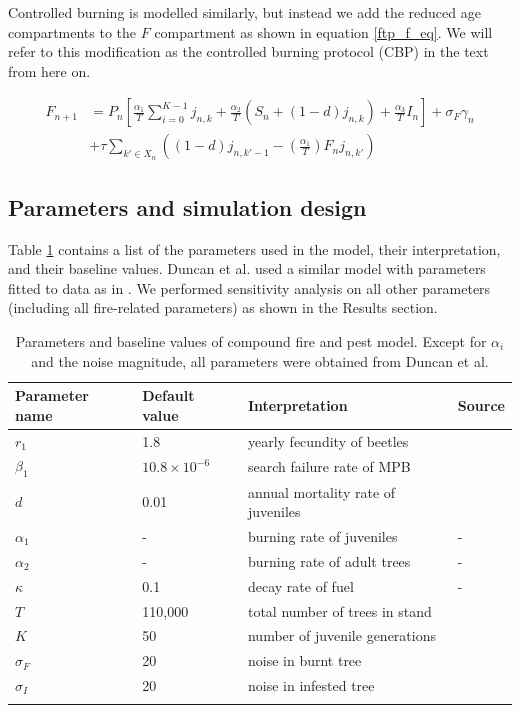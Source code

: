 Controlled burning is modelled similarly, but instead we add the reduced age compartments to the $F$ compartment as shown in equation \ref{ftp_f_eq}. We will refer to this modification as the controlled burning protocol (CBP) in the text from here on.

\begin{align}
  F_{n+1} &=  P_n \left[\frac{\alpha_1}{T} \sum_{i = 0}^{K-1} j_{n,k} + \frac{\alpha_2}{T}( S_n + (1 - d)j_{n,k}) + \frac{\alpha_3}{T}I_n\right] + \sigma_F\gamma_n
  \\ &+ \tau\sum_{k' \in X_n}\left((1-d) j_{n, k' - 1} - (\frac{\alpha_1}{T}) F_n j_{n,k'}\right)\label{ftp_f_eq}
\end{align}

\subsection{Parameters and simulation design}

Table \ref{params} contains a list of the parameters used in the model, their interpretation, and their baseline values. Duncan et al. used a similar model with parameters fitted to data as in \cite{agne2016fire}. We performed sensitivity analysis on all other parameters (including all fire-related parameters) as shown in the Results section.

\begin{table}
\caption{Parameters and baseline values of compound fire and pest model. Except for $\alpha_i$ and the noise magnitude, all parameters were obtained from Duncan et al. \cite{duncan2015model}}
\begin{tabular}{llll}
\hline\noalign{\smallskip}
  Parameter name & Default value & Interpretation & Source \\
\hline\noalign{\smallskip}
  $r_1$ & 1.8  & yearly fecundity of beetles & \cite{powell2009connecting}  \\
  $\beta_1$ & $10.8 \times 10^{-6}$  & search failure rate of MPB & \cite{powell2009connecting}   \\
  $d$ & 0.01  & annual mortality rate of juveniles & \cite{duncan2015model}  \\
  $\alpha_1$& - & burning rate of juveniles & - \\
  $\alpha_2$& - & burning rate of adult trees & - \\
  $\kappa$& 0.1 & decay rate of fuel & - \\
  $T$ & 110,000 & total number of trees in stand & \cite{powell2009connecting} \\
  $K$ & 50 & number of juvenile generations & \cite{duncan2015model} \\
  $\sigma_F$ & 20 & noise in burnt tree\\
  $\sigma_I$ & 20 & noise in infested tree\\
\hline\noalign{\smallskip}
\end{tabular}
 \protect \label{params}
\end{table}
\normalsize

